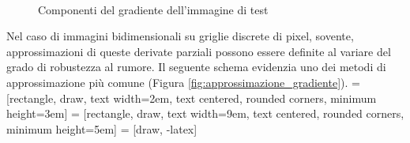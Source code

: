 \begin{figure}[!ht,scale=0.8]
\centering
{}
\\
\hspace{3mm}
\caption{Componenti del gradiente dell'immagine di test}
\label{fig:immagine_gradienti}
\end{figure}

Nel caso di immagini bidimensionali su griglie discrete di pixel, sovente, approssimazioni di queste derivate parziali possono essere definite al variare del grado di robustezza al rumore. Il seguente schema evidenzia uno dei metodi di approssimazione più comune (Figura \ref{fig:approssimazione_gradiente}).
 = [rectangle, draw, %
     text width=2em, text centered, rounded corners, minimum height=3em]
 = [rectangle, draw, %
     text width=9em, text centered, rounded corners, minimum height=5em]
 = [draw, -latex]
